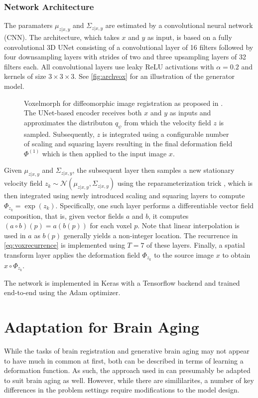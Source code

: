 \subsubsection*{Network Architecture}
The paramaters $\mu_{z | x, y}$ and $\Sigma_{z | x, y}$ are estimated by a convolutional neural network (CNN). The architecture, which takes $x$ and $y$ as input, is based on a fully convolutional 3D UNet consisting of a convolutional layer of 16 filters followed by four downsampling layers with strides of two and three upsampling layers of 32 filters each. All convolutional layers use leaky ReLU activations with $\alpha = 0.2$ and kernels of size $3\times3\times3$. See \autoref{fig:archvox} for an illustration of the generator model.

\begin{figure}
	\centering
	
	\caption{Voxelmorph for diffeomorphic image registration as proposed in \cite{dalca2018unsupervised}. The UNet-based encoder receives both $x$ and $y$ as inputs and approximates the distributon $q_\psi$ from which the velocity field $z$ is sampled. Subsequently, $z$ is integrated using a configurable number of scaling and squaring layers resulting in the final deformation field $\Phi^{(1)}$ which is then applied to the input image $x$.}
	\label{fig:archvox}
\end{figure}

Given $\mu_{z | x, y}$ and $\Sigma_{z | x, y}$, the subsequent layer then samples a new stationary velocity field $ { z_k \sim \mathcal{N}(\mu_{z | x, y}, \Sigma_{z | x, y}) } $ using the reparameterization trick \cite{kingma2013auto}, which is then integrated using newly introduced scaling and squaring layers to compute $\Phi_{z_k} = \exp(z_k)$. Specifically, one such layer performs a differentiable vector field composition, that is, given vector fields $a$ and $b$, it computes $(a \circ b)(p) = a(b(p))$ for each voxel $p$. Note that linear interpolation is used in $a$ as $b(p)$ generally yields a non-integer location. The recurrence in \autoref{eq:voxrecurrence} is implemented using $T = 7$ of these layers. Finally, a spatial transform layer applies the deformation field $\Phi_{z_k}$ to the source image $x$ to obtain $x \circ \Phi_{z_k}$.

The network is implemented in Keras with a Tensorflow backend and trained end-to-end using the Adam \cite{kingma2014adam} optimizer.

\section{Adaptation for Brain Aging}
While the tasks of brain registration and generative brain aging may not appear to have much in common at first, both can be described in terms of learning a deformation function. As such, the approach used in \cite{balakrishnan2019voxelmorph} can presumably be adapted to suit brain aging as well. However, while there are simililarites, a number of key differences in the problem settings require modifications to the model design.

